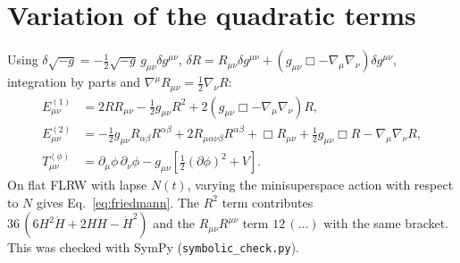 \documentclass[11pt,a4paper]{article}
\begin{document}
\appendix
\section{Variation of the quadratic terms}\label{app:variation}
Using $\delta\sqrt{-g}=-\tfrac12\sqrt{-g}\,g_{\mu\nu}\delta g^{\mu\nu}$, $\delta R=R_{\mu\nu}\delta g^{\mu\nu}+(g_{\mu\nu}\Box-\nabla_\mu\nabla_\nu)\delta g^{\mu\nu}$, integration by parts and $\nabla^\mu R_{\mu\nu}=\tfrac12\nabla_\nu R$:
\begin{align}
E^{(1)}_{\mu\nu}&=2RR_{\mu\nu}-\tfrac12g_{\mu\nu}R^2+2(g_{\mu\nu}\Box-\nabla_\mu\nabla_\nu)R,\\
E^{(2)}_{\mu\nu}&=-\tfrac12g_{\mu\nu}R_{\alpha\beta}R^{\alpha\beta}+2R_{\mu\alpha\nu\beta}R^{\alpha\beta}+\Box R_{\mu\nu}+\tfrac12g_{\mu\nu}\Box R-\nabla_\mu\nabla_\nu R,\\
T^{(\phi)}_{\mu\nu}&=\partial_\mu\phi\,\partial_\nu\phi-g_{\mu\nu}\left[\tfrac12(\partial\phi)^2+V\right].
\end{align}
On flat FLRW with lapse $N(t)$, varying the minisuperspace action with respect to $N$ gives Eq.~\eqref{eq:friedmann}. The $R^2$ term contributes $36\,(6H^2\dot H+2H\ddot H-\dot H^2)$ and the $R_{\mu\nu}R^{\mu\nu}$ term $12\,(\ldots)$ with the same bracket. This was checked with SymPy (\texttt{symbolic\_check.py}).
\end{document}
